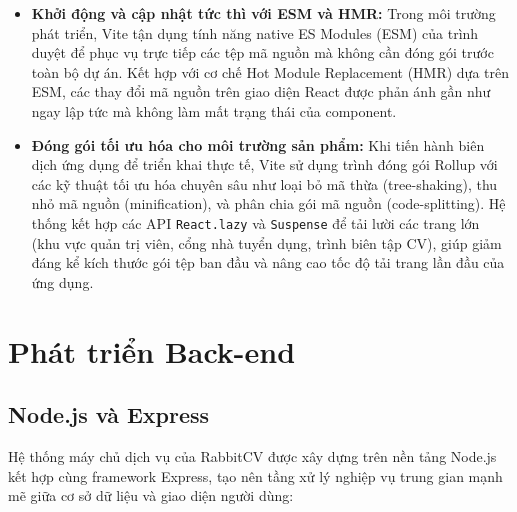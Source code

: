 \begin{itemize}
    \item \textbf{Khởi động và cập nhật tức thì với ESM và HMR:} Trong môi trường phát triển, Vite tận dụng tính năng native ES Modules (ESM) của trình duyệt để phục vụ trực tiếp các tệp mã nguồn mà không cần đóng gói trước toàn bộ dự án. Kết hợp với cơ chế Hot Module Replacement (HMR) dựa trên ESM, các thay đổi mã nguồn trên giao diện React được phản ánh gần như ngay lập tức mà không làm mất trạng thái của component.
    \item \textbf{Đóng gói tối ưu hóa cho môi trường sản phẩm:} Khi tiến hành biên dịch ứng dụng để triển khai thực tế, Vite sử dụng trình đóng gói Rollup với các kỹ thuật tối ưu hóa chuyên sâu như loại bỏ mã thừa (tree-shaking), thu nhỏ mã nguồn (minification), và phân chia gói mã nguồn (code-splitting). Hệ thống kết hợp các API \texttt{React.lazy} và \texttt{Suspense} để tải lười các trang lớn (khu vực quản trị viên, cổng nhà tuyển dụng, trình biên tập CV), giúp giảm đáng kể kích thước gói tệp ban đầu và nâng cao tốc độ tải trang lần đầu của ứng dụng.
\end{itemize}

\section{Phát triển Back-end}

\subsection{Node.js và Express}

Hệ thống máy chủ dịch vụ của RabbitCV được xây dựng trên nền tảng Node.js kết hợp cùng framework Express, tạo nên tầng xử lý nghiệp vụ trung gian mạnh mẽ giữa cơ sở dữ liệu và giao diện người dùng:

